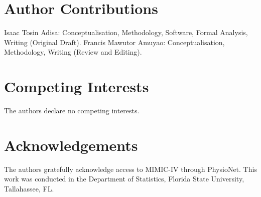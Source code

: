 \documentclass[11pt,a4paper]{article}
\begin{document}
\section*{Author Contributions}
Isaac Tosin Adisa: Conceptualisation, Methodology, Software, Formal Analysis, Writing (Original Draft).
Francis Mawutor Amuyao: Conceptualisation, Methodology, Writing (Review and Editing).

\section*{Competing Interests}
The authors declare no competing interests.

\section*{Acknowledgements}
The authors gratefully acknowledge access to MIMIC-IV through PhysioNet. This work was conducted in the Department of Statistics, Florida State University, Tallahassee, FL.


\end{document}
